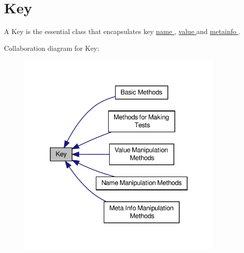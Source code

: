\hypertarget{group__key}{\section{Key}
\label{group__key}
}


A Key is the essential class that encapsulates key \hyperlink{group__keyname}{name }, \hyperlink{group__keyvalue}{value } and \hyperlink{group__keymeta}{metainfo }.  


Collaboration diagram for Key\-:\nopagebreak
\begin{figure}[H]
\begin{center}
\leavevmode
\includegraphics[width=288pt]{group__key}
\end{center}
\end{figure}
